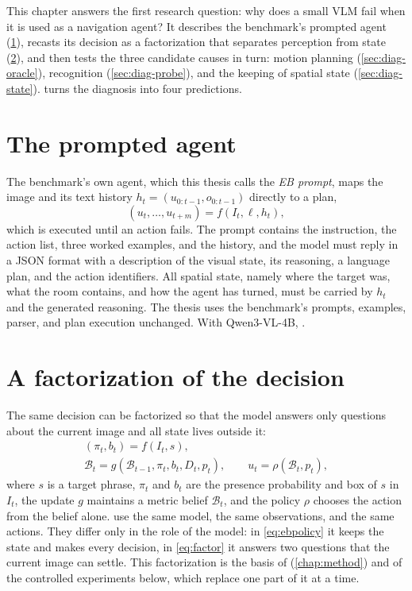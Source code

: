 \label{chap:diagnosis}
This chapter answers the first research question: why does a small VLM fail when it is used as a navigation agent?
It describes the benchmark's prompted agent (\cref{sec:diag-eb}), recasts its decision as a factorization that
separates perception from state (\cref{sec:diag-factor}), and then tests the three candidate causes in turn: motion
planning (\cref{sec:diag-oracle}), recognition (\cref{sec:diag-probe}), and the keeping of spatial state
(\cref{sec:diag-state}).  turns the diagnosis into four predictions.

\section{The prompted agent}
\label{sec:diag-eb}
The benchmark's own agent, which this thesis calls the \emph{EB prompt}, maps the image and its text history
$h_t=(u_{0:t-1},o_{0:t-1})$ directly to a plan,
\begin{equation}
(u_t,\dots,u_{t+m})=f(I_t,\ell,h_t),
\label{eq:ebpolicy}
\end{equation}
which is executed until an action fails. The prompt contains the instruction, the action list, three worked
examples, and the history, and the model must reply in a JSON format with a description of the visual state, its
reasoning, a language plan, and the action identifiers. All spatial state, namely where the target was, what the room
contains, and how the agent has turned, must be carried by $h_t$ and the generated reasoning. The thesis uses the
benchmark's prompts, examples, parser, and plan execution unchanged. With Qwen3-VL-4B, \nEBThreeParse.

\section{A factorization of the decision}
\label{sec:diag-factor}
The same decision can be factorized so that the model answers only questions about the current image and all state
lives outside it:
\begin{equation}
\begin{gathered}
(\pi_t,b_t)=f(I_t,s),\\
\mathcal{B}_t=g(\mathcal{B}_{t-1},\pi_t,b_t,D_t,p_t),\qquad u_t=\rho(\mathcal{B}_t,p_t),
\end{gathered}
\label{eq:factor}
\end{equation}
where $s$ is a target phrase, $\pi_t$ and $b_t$ are the presence probability and box of $s$ in $I_t$, the update $g$
maintains a metric belief $\mathcal{B}_t$, and the policy $\rho$ chooses the action from the belief alone.
 use the same model, the same observations, and the same actions. They differ only in
the role of the model: in \cref{eq:ebpolicy} it keeps the state and makes every decision, in \cref{eq:factor} it
answers two questions that the current image can settle. This factorization is the basis of \ours
(\cref{chap:method}) and of the controlled experiments below, which replace one part of it at a time.

